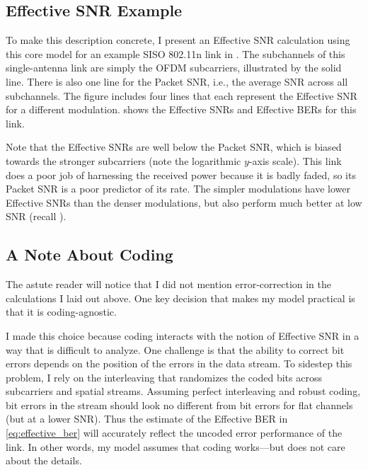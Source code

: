 \subsection{Effective SNR Example}
To make this description concrete, I present an Effective SNR calculation using this core model for an example SISO 802.11n link in .  The subchannels of this single-antenna link are simply the OFDM subcarriers, illustrated by the solid line. There is also one line for the Packet SNR, i.e., the average SNR across all subchannels. The figure includes four lines that each represent the Effective SNR for a different modulation.  shows the Effective SNRs and Effective BERs for this link.

Note that the Effective SNRs are well below the Packet SNR, which is biased towards the stronger subcarriers (note the logarithmic $y$-axis scale). This link does a poor job of harnessing the received power because it is badly faded, so its Packet SNR is a poor predictor of its rate. The simpler modulations have lower Effective SNRs than the denser modulations, but also perform much better at low SNR (recall ).


\subsection{A Note About Coding}
The astute reader will notice that I did not mention error-correction in the calculations I laid out above. One key decision that makes my model practical is that it is coding-agnostic.

I made this choice because coding interacts with the notion of Effective SNR in a way that is difficult to analyze. One challenge is that the ability to correct bit errors depends on the position of the errors in the data stream. To sidestep this problem, I rely on the interleaving that randomizes the coded bits across subcarriers and spatial streams. Assuming perfect interleaving and robust coding, bit errors in the stream should look no different from bit errors for flat channels (but at a lower SNR). Thus the estimate of the Effective BER in \eqref{eq:effective_ber} will accurately reflect the uncoded error performance of the link. In other words, my model assumes that coding works---but does not care about the details.

